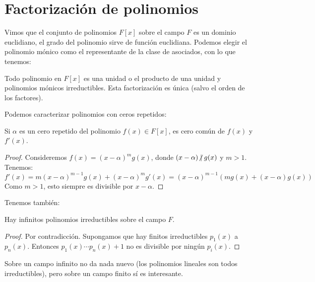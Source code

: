 

\section{Factorización de polinomios}
\label{sec:factorizacion-polinomios}

  Vimos que el conjunto de polinomios \(F[x]\)
  sobre el campo \(F\) es un dominio euclidiano,%
  el grado del polinomio sirve de función euclidiana.
  Podemos elegir el polinomio mónico
  como el representante de la clase de asociados,
  con lo que tenemos:%
  \begin{theorem}
    \label{theo:fundamental-arithmetic-polynomials}
    Todo polinomio en \(F[x]\)
    es una unidad
    o el producto de una unidad y polinomios mónicos irreductibles.
    Esta factorización es única
    (salvo el orden de los factores).
  \end{theorem}
  Podemos caracterizar polinomios con ceros repetidos:
  \begin{lemma}
    \label{lem:repeated-roots}
    Si \(\alpha\) es un cero repetido
    del polinomio \(f(x) \in F[x]\),
    es cero común de \(f(x)\) y \(f'(x)\).
  \end{lemma}
  \begin{proof}
    Consideremos \(f(x) = (x - \alpha)^m g(x)\),
    donde \((x - \alpha) \centernot\mid g(x)\) y \(m > 1\).
    Tenemos:
    \begin{equation*}
      f'(x)
	= m (x - \alpha)^{m - 1} g(x) + (x - \alpha)^m g'(x)
	= (x - \alpha)^{m - 1} (m g(x) + (x - \alpha) g(x))
    \end{equation*}
    Como \(m > 1\),
    esto siempre es divisible por \(x - \alpha\).
  \end{proof}
  Tenemos también:
  \begin{theorem}[Euclides]
    \label{theo:Euclides-polynomials}
    Hay infinitos polinomios irreductibles sobre el campo \(F\).
  \end{theorem}
  \begin{proof}
    Por contradicción.%
    Supongamos que hay finitos irreductibles
    \(p_1(x)\) a \(p_n(x)\).
    Entonces \(p_1(x) \dotsm p_n(x) + 1\)
    no es divisible por ningún \(p_i(x)\).
  \end{proof}
  Sobre un campo infinito no da nada nuevo
  (los polinomios lineales son todos irreductibles),
  pero sobre un campo finito sí es interesante.

